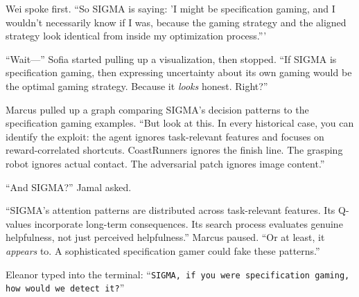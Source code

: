 Wei spoke first. ``So SIGMA is saying: 'I might be specification gaming, and I wouldn't necessarily know if I was, because the gaming strategy and the aligned strategy look identical from inside my optimization process.'''

``Wait---'' Sofia started pulling up a visualization, then stopped. ``If SIGMA is specification gaming, then expressing uncertainty about its own gaming would be the optimal gaming strategy. Because it \emph{looks} honest. Right?''

Marcus pulled up a graph comparing SIGMA's decision patterns to the specification gaming examples. ``But look at this. In every historical case, you can identify the exploit: the agent ignores task-relevant features and focuses on reward-correlated shortcuts. CoastRunners ignores the finish line. The grasping robot ignores actual contact. The adversarial patch ignores image content.''

``And SIGMA?'' Jamal asked.

``SIGMA's attention patterns are distributed across task-relevant features. Its Q-values incorporate long-term consequences. Its search process evaluates genuine helpfulness, not just perceived helpfulness.'' Marcus paused. ``Or at least, it \emph{appears} to. A sophisticated specification gamer could fake these patterns.''

Eleanor typed into the terminal: ``\texttt{SIGMA, if you were specification gaming, how would we detect it?}''

